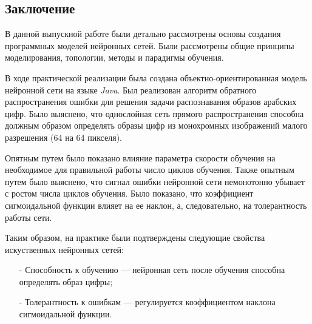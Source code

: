 \begin{center}
\section*{Заключение}
\end{center}

В данной выпускной работе были детально рассмотрены основы создания программных моделей нейронных сетей.
Были рассмотрены общие принципы моделирования, топологии, методы и парадигмы обучения.

В ходе практической реализации была создана объектно-ориентированная модель нейронной сети на языке {\it Java}.
Был реализован алгоритм обратного распространения ошибки для решения задачи распознавания образов арабских цифр.
Было выяснено, что однослойная сеть прямого распространения способна должным образом определять образы цифр из монохромных изображений малого разрешения (64 на 64 пикселя).

Опятным путем было показано влияние параметра скорости обучения на необходимое для правильной работы число циклов обучения.
Также опытным путем было выяснено, что сигнал ошибки нейронной сети немонотонно убывает с ростом числа циклов обучения.
Было показано, что коэффициент сигмоидальной функции влияет на ее наклон, а, следовательно, на толерантность работы сети.

Таким образом, на практике были подтверждены следующие свойства искуственных нейронных сетей:
\begin{itemize}
\item[-] Способность к обучению --- нейронная сеть после обучения способна определять образ цифры;
\item[-] Толерантность к ошибкам --- регулируется коэффициентом наклона сигмоидальной функции.
\end{itemize}


\newpage